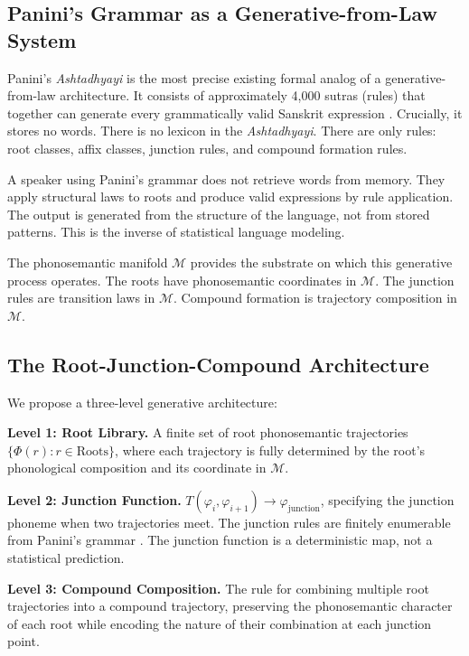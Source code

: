 \documentclass[12pt]{article}
\begin{document}
\subsection{Panini's Grammar as a Generative-from-Law System}

Panini's \textit{Ashtadhyayi} is the most precise existing formal analog of a generative-from-law architecture. It consists of approximately 4,000 sutras (rules) that together can generate every grammatically valid Sanskrit expression \citep{kiparsky1982}. Crucially, it stores no words. There is no lexicon in the \textit{Ashtadhyayi}. There are only rules: root classes, affix classes, junction rules, and compound formation rules.

A speaker using Panini's grammar does not retrieve words from memory. They apply structural laws to roots and produce valid expressions by rule application. The output is generated from the structure of the language, not from stored patterns. This is the inverse of statistical language modeling.

The phonosemantic manifold $\mathcal{M}$ provides the substrate on which this generative process operates. The roots have phonosemantic coordinates in $\mathcal{M}$. The junction rules are transition laws in $\mathcal{M}$. Compound formation is trajectory composition in $\mathcal{M}$.

\subsection{The Root-Junction-Compound Architecture}

We propose a three-level generative architecture:

\textbf{Level 1: Root Library.} A finite set of root phonosemantic trajectories $\{\Phi(r) : r \in \text{Roots}\}$, where each trajectory is fully determined by the root's phonological composition and its coordinate in $\mathcal{M}$.

\textbf{Level 2: Junction Function.} $T(\varphi_i, \varphi_{i+1}) \to \varphi_\text{junction}$, specifying the junction phoneme when two trajectories meet. The junction rules are finitely enumerable from Panini's grammar \citep{kiparsky1982}. The junction function is a deterministic map, not a statistical prediction.

\textbf{Level 3: Compound Composition.} The rule for combining multiple root trajectories into a compound trajectory, preserving the phonosemantic character of each root while encoding the nature of their combination at each junction point.
\end{document}
